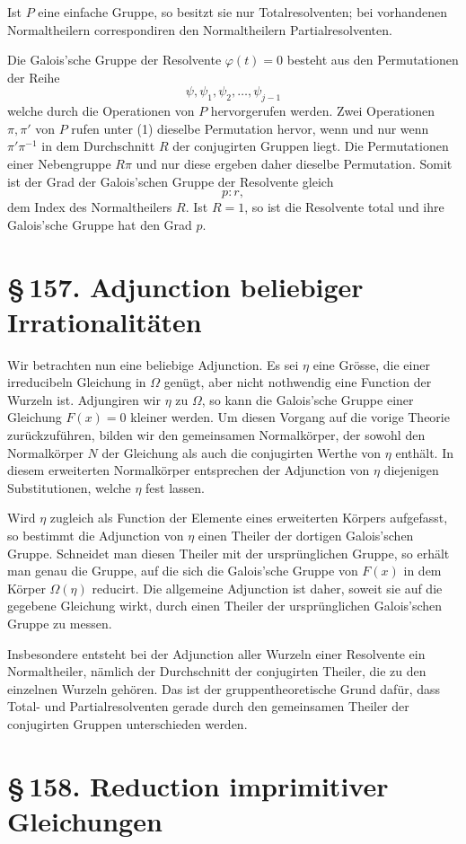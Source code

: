 \documentclass[11pt]{article}
\providecommand{\sect}[2]{\section*{\S\,#1. #2}}
\begin{document}
Ist $P$ eine einfache Gruppe, so besitzt sie nur Totalresolventen; bei vorhandenen Normaltheilern correspondiren den Normaltheilern Partialresolventen.

Die Galois'sche Gruppe der Resolvente $\varphi(t)=0$ besteht aus den Permutationen der Reihe
\[
        \psi,
\psi_1,
\psi_2,
\ldots,
\psi_{j-1}
\tag{1}
\]
welche durch die Operationen von $P$ hervorgerufen werden. Zwei Operationen $\pi,\pi'$ von $P$ rufen unter (1) dieselbe Permutation hervor, wenn und nur wenn $\pi'\pi^{-1}$ in dem Durchschnitt $R$ der conjugirten Gruppen liegt. Die Permutationen einer Nebengruppe $R\pi$ und nur diese ergeben daher dieselbe Permutation. Somit ist der Grad der Galois'schen Gruppe der Resolvente gleich
\[
        p:r,
\]
dem Index des Normaltheilers $R$. Ist $R=1$, so ist die Resolvente total und ihre Galois'sche Gruppe hat den Grad $p$.

\sect{157}{Adjunction beliebiger Irrationalitäten}

Wir betrachten nun eine beliebige Adjunction. Es sei $\eta$ eine Grösse, die einer irreducibeln Gleichung in $\Omega$ genügt, aber nicht nothwendig eine Function der Wurzeln ist. Adjungiren wir $\eta$ zu $\Omega$, so kann die Galois'sche Gruppe einer Gleichung $F(x)=0$ kleiner werden. Um diesen Vorgang auf die vorige Theorie zurückzuführen, bilden wir den gemeinsamen Normalkörper, der sowohl den Normalkörper $N$ der Gleichung als auch die conjugirten Werthe von $\eta$ enthält. In diesem erweiterten Normalkörper entsprechen der Adjunction von $\eta$ diejenigen Substitutionen, welche $\eta$ fest lassen.

Wird $\eta$ zugleich als Function der Elemente eines erweiterten Körpers aufgefasst, so bestimmt die Adjunction von $\eta$ einen Theiler der dortigen Galois'schen Gruppe. Schneidet man diesen Theiler mit der ursprünglichen Gruppe, so erhält man genau die Gruppe, auf die sich die Galois'sche Gruppe von $F(x)$ in dem Körper $\Omega(\eta)$ reducirt. Die allgemeine Adjunction ist daher, soweit sie auf die gegebene Gleichung wirkt, durch einen Theiler der ursprünglichen Galois'schen Gruppe zu messen.

Insbesondere entsteht bei der Adjunction aller Wurzeln einer Resolvente ein Normaltheiler, nämlich der Durchschnitt der conjugirten Theiler, die zu den einzelnen Wurzeln gehören. Das ist der gruppentheoretische Grund dafür, dass Total- und Partialresolventen gerade durch den gemeinsamen Theiler der conjugirten Gruppen unterschieden werden.

\sect{158}{Reduction imprimitiver Gleichungen}
\end{document}
